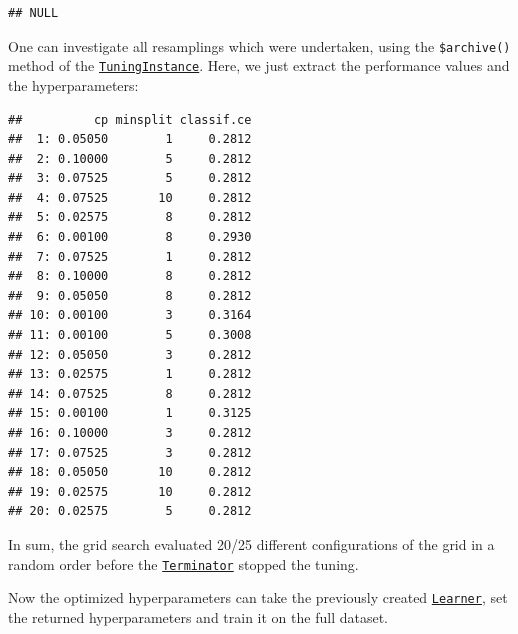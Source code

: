 \documentclass[]{article}
\newenvironment{Shaded}{\begin{snugshade}}{\end{snugshade}}
\newcommand{\DataTypeTok}[1]{\textcolor[rgb]{0.13,0.29,0.53}{#1}}
\newcommand{\KeywordTok}[1]{\textcolor[rgb]{0.13,0.29,0.53}{\textbf{#1}}}
\newcommand{\NormalTok}[1]{#1}
\newcommand{\OperatorTok}[1]{\textcolor[rgb]{0.81,0.36,0.00}{\textbf{#1}}}
\newcommand{\StringTok}[1]{\textcolor[rgb]{0.31,0.60,0.02}{#1}}
\renewenvironment{Shaded} {\begin{snugshade}\small} {\end{snugshade}}
\begin{document}
\begin{verbatim}
## NULL
\end{verbatim}

One can investigate all resamplings which were undertaken, using the \texttt{\$archive()} method of the \href{https://mlr3tuning.mlr-org.com/reference/TuningInstance.html}{\texttt{TuningInstance}}.
Here, we just extract the performance values and the hyperparameters:

\begin{Shaded}
\end{Shaded}

\begin{verbatim}
##          cp minsplit classif.ce
##  1: 0.05050        1     0.2812
##  2: 0.10000        5     0.2812
##  3: 0.07525        5     0.2812
##  4: 0.07525       10     0.2812
##  5: 0.02575        8     0.2812
##  6: 0.00100        8     0.2930
##  7: 0.07525        1     0.2812
##  8: 0.10000        8     0.2812
##  9: 0.05050        8     0.2812
## 10: 0.00100        3     0.3164
## 11: 0.00100        5     0.3008
## 12: 0.05050        3     0.2812
## 13: 0.02575        1     0.2812
## 14: 0.07525        8     0.2812
## 15: 0.00100        1     0.3125
## 16: 0.10000        3     0.2812
## 17: 0.07525        3     0.2812
## 18: 0.05050       10     0.2812
## 19: 0.02575       10     0.2812
## 20: 0.02575        5     0.2812
\end{verbatim}

In sum, the grid search evaluated 20/25 different configurations of the grid in a random order before the \href{https://mlr3tuning.mlr-org.com/reference/Terminator.html}{\texttt{Terminator}} stopped the tuning.

Now the optimized hyperparameters can take the previously created \href{https://mlr3.mlr-org.com/reference/Learner.html}{\texttt{Learner}}, set the returned hyperparameters and train it on the full dataset.

\begin{Shaded}
\end{Shaded}
\end{document}
